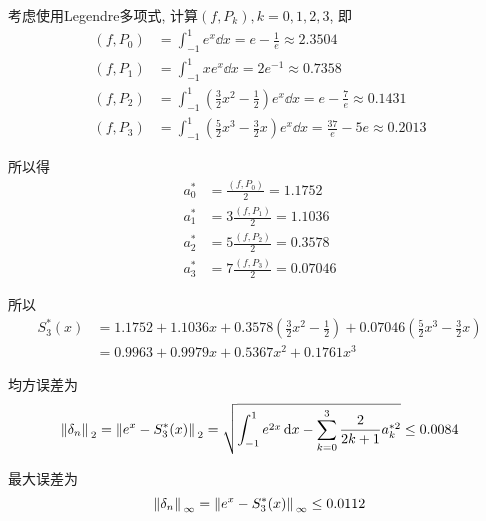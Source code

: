 \begin{solution}
    考虑使用Legendre多项式, 计算$(f,P_k),k=0,1,2,3$, 即
    \begin{align*}
        (f,P_0)&=\int_{-1}^1e^x\dd{x}=e-\frac{1}{e}\approx2.3504\\
        (f,P_1)&=\int_{-1}^1xe^x\dd{x}=2e^{-1}\approx0.7358\\
        (f,P_2)&=\int_{-1}^1\left(\frac{3}{2}x^2-\frac{1}{2}\right)e^x\dd{x}=e-\frac{7}{e}\approx0.1431\\
        (f,P_3)&=\int_{-1}^1\left(\frac{5}{2}x^3-\frac{3}{2}x\right)e^x\dd{x}=\frac{37}{e}-5e\approx0.2013
    \end{align*}

    所以得
    \begin{align*}
        a_0^*&=\frac{(f,P_0)}{2}=1.1752\\
        a_1^*&=3\frac{(f,P_1)}{2}=1.1036\\
        a_2^*&=5\frac{(f,P_2)}{2}=0.3578\\
        a_3^*&=7\frac{(f,P_3)}{2}=0.07046
    \end{align*}
    
    所以
    \begin{align*}
        S_3^*(x)&=1.1752+1.1036x+0.3578\left(\frac{3}{2}x^2-\frac{1}{2}\right)+0.07046\left(\frac{5}{2}x^3-\frac{3}{2}x\right)\\
        &=0.9963+0.9979x+0.5367x^2+0.1761x^3
    \end{align*}

    均方误差为
    \begin{equation*}
        \norm*{\delta_n}_2=\norm*{e^x-S_3^*(x)}_2=\sqrt{\int_{-1}^1e^{2x}\dd{x}-\sum_{k=0}^3\frac{2}{2k+1}a_k^{*2}}\le0.0084
    \end{equation*}

    最大误差为
    \begin{equation*}
        \norm*{\delta_n}_\infty=\norm*{e^x-S_3^*(x)}_\infty\le0.0112
    \end{equation*}
\end{solution}